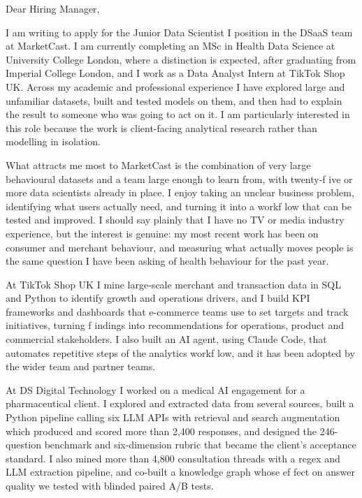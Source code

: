 \documentclass[letterpaper,11pt]{article}
\begin{document}
Dear Hiring Manager,

I am writing to apply for the Junior Data Scientist I position in the DSaaS team at MarketCast. I am currently completing an MSc in Health Data Science at University College London, where a distinction is expected, after graduating from Imperial College London, and I work as a Data Analyst Intern at TikTok Shop UK. Across my academic and professional experience I have explored large and unfamiliar datasets, built and tested models on them, and then had to explain the result to someone who was going to act on it. I am particularly interested in this role because the work is client-facing analytical research rather than modelling in isolation.

What attracts me most to MarketCast is the combination of very large behavioural datasets and a team large enough to learn from, with twenty-f\kern0pt ive or more data scientists already in place. I enjoy taking an unclear business problem, identifying what users actually need, and turning it into a workf\kern0pt low that can be tested and improved. I should say plainly that I have no TV or media industry experience, but the interest is genuine: my most recent work has been on consumer and merchant behaviour, and measuring what actually moves people is the same question I have been asking of health behaviour for the past year.

At TikTok Shop UK I mine large-scale merchant and transaction data in SQL and Python to identify growth and operations drivers, and I build KPI frameworks and dashboards that e-commerce teams use to set targets and track initiatives, turning f\kern0pt indings into recommendations for operations, product and commercial stakeholders. I also built an AI agent, using Claude Code, that automates repetitive steps of the analytics workf\kern0pt low, and it has been adopted by the wider team and partner teams.

At DS Digital Technology I worked on a medical AI engagement for a pharmaceutical client. I explored and extracted data from several sources, built a Python pipeline calling six LLM APIs with retrieval and search augmentation which produced and scored more than 2,400 responses, and designed the 246-question benchmark and six-dimension rubric that became the client's acceptance standard. I also mined more than 4,800 consultation threads with a regex and LLM extraction pipeline, and co-built a knowledge graph whose ef\kern0pt fect on answer quality we tested with blinded paired A/B tests.
\end{document}
